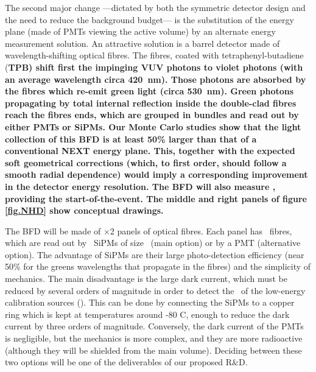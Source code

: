 \indent

The second major change ---dictated by both the symmetric detector design and the need to reduce the background budget--- is the substitution of the energy plane (made of PMTs viewing the active volume) by an alternate energy measurement solution.  An attractive solution is a barrel detector made of wavelength-shifting optical fibres. The fibres, coated with tetraphenyl-butadiene (\bf TPB) shift first the impinging VUV photons to violet photons (with an average wavelength circa \SI{420}{\nm}). Those photons are absorbed by the fibres which re-emit green light (circa  \SI{530}{\nm}). Green photons propagating by total internal reflection inside the double-clad fibres reach the fibres ends, which are grouped in bundles and read out by either PMTs or SiPMs. Our Monte Carlo studies show that the light collection of this BFD is at least 50\% larger than that of a conventional NEXT energy plane. This, together with the expected soft geometrical corrections (which, to first order, should follow a smooth radial dependence) would imply a corresponding improvement in the detector energy resolution. The BFD will also measure \sone, providing the start-of-the-event.  The middle and right panels of figure \ref{fig.NHD} show conceptual drawings. 

\indent


The BFD will be made of \BFDNP$\times$2 panels of optical fibres. Each panel has \BFDNFPP\ fibres, which are read out by \BFDNSIPMPP\ SiPMs
of size \BFDNSIPM\ (main option) or by a PMT (alternative option). The advantage of SiPMs are their large photo-detection efficiency (near 50\% for the greens wavelengths that propagate in the fibres) and the simplicity of mechanics. The main disadvantage is the large dark current, which must be reduced by several orders of magnitude in order to detect the \sone\ of the low-energy calibration sources (). This can be done by connecting the SiPMs to a copper ring which is kept at temperatures around -80 C, enough to reduce the dark current by three orders of magnitude. Conversely, the dark current of the PMTs is negligible, but the mechanics is more complex, and they are more radioactive (although they will be shielded from the main volume). Deciding between these two options will be one of the
deliverables of our proposed R\&D. 


\indent

